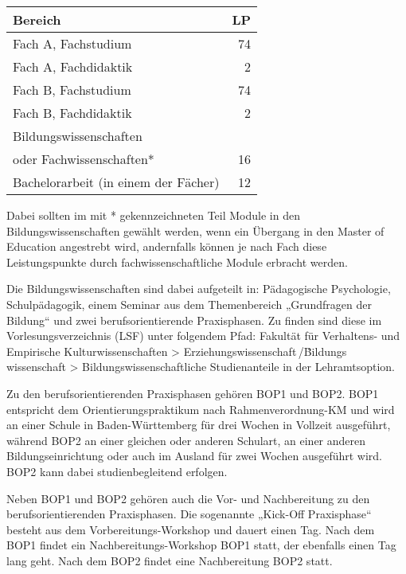 \begin{table}[htb]
	\begin{tabular*}{\linewidth}{lr}
		\toprule
		Bereich & \gls{LP}\\
		\midrule
		Fach A, Fachstudium & 74\\
		Fach A, Fachdidaktik & \phantom{0}2\\
		\addlinespace
		Fach B, Fachstudium & 74\\
		Fach B, Fachdidaktik & \phantom{0}2\\
		\addlinespace
		Bildungswissenschaften&\\
		oder Fachwissenschaften* & 16\\
		\addlinespace
		Bachelorarbeit (in einem der Fächer) & 12\\
		\bottomrule
	\end{tabular*}
	\vspace{-4mm}
\end{table}

Dabei sollten im mit * gekennzeichneten Teil Module in den Bildungswissenschaften gewählt werden, wenn ein Übergang in den Master of Education angestrebt wird, andernfalls können je nach Fach diese Leistungspunkte durch fachwissenschaftliche Module erbracht werden.

Die Bildungswissenschaften sind dabei aufgeteilt in: Pä\-da\-go\-gische Psychologie, Schulpädagogik, einem Seminar aus dem Themenbereich „Grundfragen der Bildung“ und  zwei berufsorientierende Praxisphasen. Zu finden sind diese im Vorlesungsverzeichnis (LSF) unter folgendem Pfad:
Fakultät für Verhaltens- und Empirische Kulturwissenschaften > Erziehungs\-wissenschaft\,/\.  Bildungs\,wissenschaft > Bildungswissenschaftliche Studienanteile in der Lehramtsoption.


Zu den berufsorientierenden Praxisphasen gehören BOP1 und BOP2. BOP1 entspricht dem Orientierungspraktikum nach Rahmenverordnung-KM und wird an einer Schule in Baden-Württemberg für drei Wochen in Vollzeit ausgeführt, während BOP2 an einer gleichen oder anderen Schulart, an einer anderen Bildungseinrichtung oder auch im Ausland für zwei Wochen ausgeführt wird. BOP2 kann dabei studienbegleitend erfolgen.

Neben BOP1 und BOP2 gehören auch die Vor- und Nachbereitung zu den berufsorientierenden Praxisphasen. Die sogenannte „Kick-Off Praxisphase“ besteht aus dem Vorbereitungs-Workshop und dauert einen Tag. Nach dem BOP1 findet ein Nachbereitungs-Workshop BOP1 statt, der ebenfalls einen Tag lang geht. Nach dem BOP2 findet eine Nachbereitung BOP2 statt.

